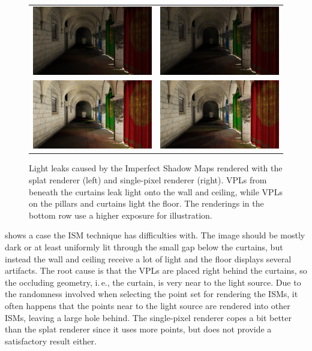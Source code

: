  \begin{figure}[htb]
 \centering
   \begin{tabular}{@{}cc@{}}
     \includegraphics[width=.22\textwidth]{../screenshots/leaks_splat} &
     \includegraphics[width=.22\textwidth]{../screenshots/leaks_single_pixel}\\
     \includegraphics[width=.22\textwidth]{../screenshots/leaks_splat_exposure} &
     \includegraphics[width=.22\textwidth]{../screenshots/leaks_single_pixel_exposure}
   \end{tabular}
   \caption{Light leaks caused by the Imperfect Shadow Maps rendered with the splat renderer (left) and single-pixel renderer (right). VPLs from beneath the curtains leak light onto the wall and ceiling, while VPLs on the pillars and curtains light the floor. The renderings in the bottom row use a higher exposure for illustration. }
   \label{fig:results:leaks}
 \end{figure}


  shows a case the ISM technique has difficulties with. The image should be mostly dark or at least uniformly lit through the small gap below the curtains, but instead the wall and ceiling receive a lot of light and the floor displays several artifacts. The root cause is that the VPLs are placed right behind the curtains, so the occluding geometry, i.\,e., the curtain, is very near to the light source. Due to the randomness involved when selecting the point set for rendering the ISMs, it often happens that the points near to the light source are rendered into other ISMs, leaving a large hole behind. The single-pixel renderer copes a bit better than the splat renderer since it uses more points, but does not provide a satisfactory result either.



